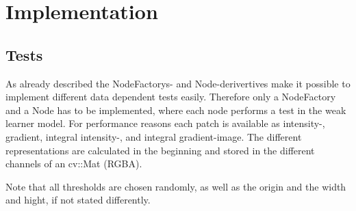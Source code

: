 \section{Implementation}
\label{sec:implementation}

\subsection{Tests}
As already described the NodeFactorys- and Node-derivertives make it possible to implement different data dependent tests easily. Therefore only a NodeFactory and a Node has to be implemented, where each node performs a test in the weak learner model.
For performance reasons each patch is available as intensity-, gradient, integral intensity-, and integral gradient-image. The different representations are calculated in the beginning and stored in the different channels of an cv::Mat (RGBA).

Note that all thresholds are chosen randomly, as well as the origin and the width and hight, if not stated differently.

